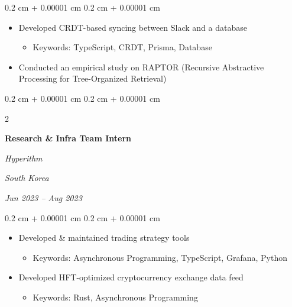 \documentclass[10pt, letterpaper]{article}
\newenvironment{highlights}{
    \begin{itemize}[
        topsep=0.10 cm,
        parsep=0.10 cm,
        partopsep=0pt,
        itemsep=0pt,
        leftmargin=0.4 cm + 10pt
    ]
}{
    \end{itemize}
} %
\newenvironment{onecolentry}{
    \begin{adjustwidth}{
        0.2 cm + 0.00001 cm
    }{
        0.2 cm + 0.00001 cm
    }
}{
    \end{adjustwidth}
} %
\newenvironment{twocolentry}[2][]{
    \onecolentry
    \def\secondColumn{#2}
    \setcolumnwidth{\fill, 4.5 cm}
    \begin{paracol}{2}
}{
    \switchcolumn \raggedleft \secondColumn
    \end{paracol}
    \endonecolentry
} %
\newenvironment{subhighlights}{
    \begin{itemize}[
        topsep=0.05 cm,
        parsep=0.05 cm,
        partopsep=0pt,
        itemsep=0pt,
        leftmargin=0.4 cm + 10pt
    ]
}{
    \end{itemize}
} %
\begin{document}
        \vspace{0.10 cm}
        \begin{onecolentry}
            \begin{highlights}
                \item Developed CRDT-based syncing between Slack and a database
                \begin{subhighlights}
                    \item Keywords: TypeScript, CRDT, Prisma, Database
                \end{subhighlights}
                \item Conducted an empirical study on RAPTOR (Recursive Abstractive Processing for Tree-Organized Retrieval)
            \end{highlights}
        \end{onecolentry}

        \vspace{0.2 cm}

        \begin{twocolentry}{
        \textit{South Korea}    
            
        \textit{Jun 2023 – Aug 2023}}
            \textbf{Research \& Infra Team Intern}
            
            \textit{Hyperithm}
        \end{twocolentry}

        \vspace{0.10 cm}
        \begin{onecolentry}
            \begin{highlights}
                \item Developed \& maintained trading strategy tools
                \begin{subhighlights}
                    \item Keywords: Asynchronous Programming, TypeScript, Grafana, Python
                \end{subhighlights}
                \item Developed HFT-optimized cryptocurrency exchange data feed
                \begin{subhighlights}
                    \item Keywords: Rust, Asynchronous Programming
                \end{subhighlights}
            \end{highlights}
        \end{onecolentry}
    
\end{document}
